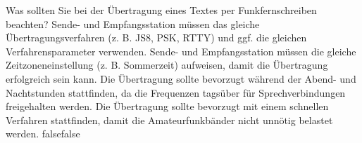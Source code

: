     {Was sollten Sie bei der Übertragung eines Textes per Funkfernschreiben beachten?}
    {Sende- und Empfangsstation müssen das gleiche Übertragungsverfahren (z. B. JS8, PSK, RTTY) und ggf. die gleichen Verfahrensparameter verwenden.}
    {Sende- und Empfangsstation müssen die gleiche Zeitzoneneinstellung (z. B. Sommerzeit) aufweisen, damit die Übertragung erfolgreich sein kann.}
    {Die Übertragung sollte bevorzugt während der Abend- und Nachtstunden stattfinden, da die Frequenzen tagsüber für Sprechverbindungen freigehalten werden.}
    {Die Übertragung sollte bevorzugt mit einem schnellen Verfahren stattfinden, damit die Amateurfunkbänder nicht unnötig belastet werden.}
    {false}{false}